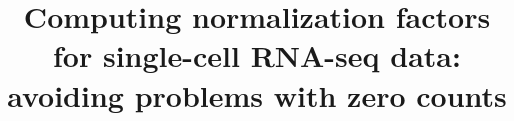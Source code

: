 \documentclass{bmcart}
\begin{document}
\begin{frontmatter}

\begin{fmbox}


\title{Computing normalization factors for single-cell RNA-seq data: avoiding problems with zero counts}


\author[
   addressref={aff1},
   corref={aff1}, 
   email={aaron.lun@cruk.cam.ac.uk}   
]{ }
\author[
   addressref={aff2},
   email={kbach@ebi.ac.uk}
]{ }
\author[
    addressref={aff1,aff2},
    email={marioni@ebi.ac.uk}
]{ }


\address[id=aff1]{%
  ,
  ,                     %
  ,                        %
  ,                              %
}
\address[id=aff2]{%
  ,
  ,
  ,
}


\end{fmbox}
\end{frontmatter}
\end{document}
